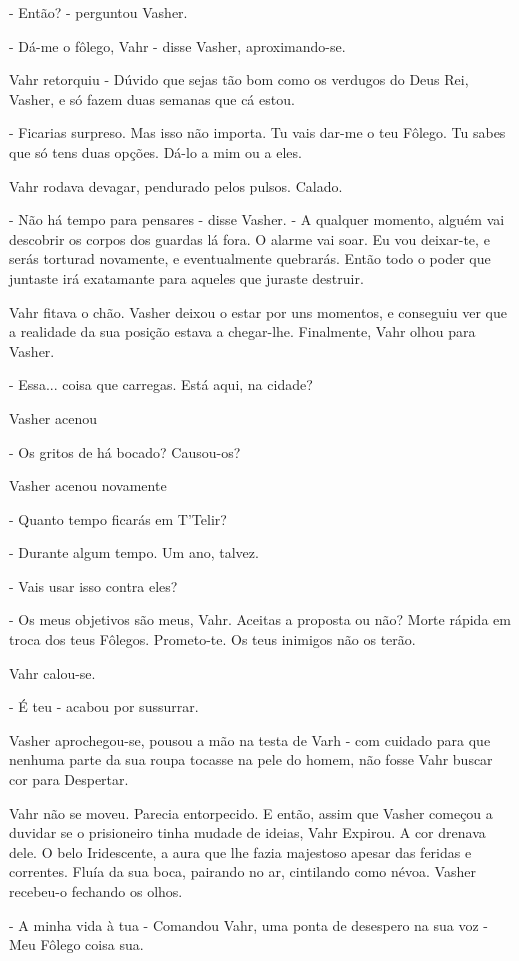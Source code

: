 \documentclass[11pt,a4paper]{book}
\begin{document}
- Então? - perguntou Vasher.

- Dá-me o fôlego, Vahr - disse Vasher, aproximando-se.

 Vahr retorquiu - Dúvido que sejas tão bom como os verdugos do Deus Rei, Vasher, e só fazem duas semanas que cá estou. 
 
 - Ficarias surpreso. Mas isso não importa. Tu vais dar-me o teu Fôlego. Tu sabes que só tens duas opções. Dá-lo a mim ou a eles.

 Vahr rodava devagar, pendurado pelos pulsos. Calado.
 
 - Não há tempo para pensares - disse Vasher. - A qualquer momento, alguém vai descobrir os corpos dos guardas lá fora. O alarme vai soar. Eu vou deixar-te, e serás torturad novamente, e eventualmente quebrarás. Então todo o poder que juntaste irá exatamante para aqueles que juraste destruir.
 
 Vahr fitava o chão. Vasher deixou o estar por uns momentos, e conseguiu ver que a realidade da sua posição estava a chegar-lhe. Finalmente, Vahr olhou para Vasher. 

 - Essa... coisa que carregas. Está aqui, na cidade?
 
 Vasher acenou

 - Os gritos de há bocado? Causou-os?
 
 Vasher acenou novamente
 
 - Quanto tempo ficarás em T'Telir?
 
 - Durante algum tempo. Um ano, talvez.
 
 - Vais usar isso contra eles?
 
 - Os meus objetivos são meus, Vahr. Aceitas a proposta ou não? Morte rápida em troca dos teus Fôlegos. Prometo-te. Os teus inimigos não os terão.

Vahr calou-se. 

- É teu - acabou por sussurrar.

Vasher aprochegou-se, pousou a mão na testa de Varh - com cuidado para que nenhuma parte da sua roupa tocasse na pele do homem, não fosse Vahr buscar cor para Despertar.

Vahr não se moveu. Parecia entorpecido. E então, assim que Vasher começou a duvidar se o prisioneiro tinha mudade de ideias, Vahr Expirou. A cor drenava dele. O belo Iridescente, a aura que lhe fazia majestoso apesar das feridas e correntes. Fluía da sua boca, pairando no ar, cintilando como névoa. Vasher recebeu-o fechando os olhos.

- A minha vida à tua - Comandou Vahr, uma ponta de desespero na sua voz - Meu Fôlego coisa sua.
\end{document}
